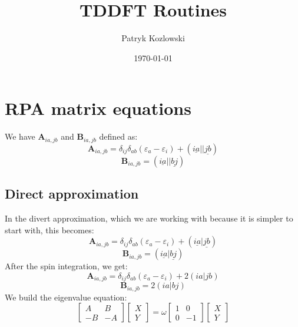 \documentclass[12pt]{article}
\author{Patryk Kozlowski}
\title{TDDFT Routines}
\date{\today}
\begin{document}
\maketitle
\section{RPA matrix equations}
We have $\textbf{A}_{ia,jb}$ and $\textbf{B}_{ia,jb}$ defined as:
\begin{equation}
    \textbf{A}_{ia,jb} = \delta _{ij}\delta _{ab}(\varepsilon _{a}- \varepsilon _{i}) + (\underline{ia}||\underline{jb})
\end{equation}
\begin{equation}
    \textbf{B}_{ia,jb} = (\underline{ia}||\underline{bj})
\end{equation}
\subsection{Direct approximation}
In the divert approximation, which we are working with because it is simpler to start with, this becomes:
\begin{equation}
    \textbf{A}_{ia,jb} = \delta _{ij}\delta _{ab}(\varepsilon _{a}- \varepsilon _{i}) + (\underline{ia}|\underline{jb})
\end{equation}
\begin{equation}
    \textbf{B}_{ia,jb} = (\underline{ia}|\underline{bj})
\end{equation}
After the spin integration, we get:
\begin{equation}
    \textbf{A}_{ia,jb} = \delta _{ij}\delta _{ab}(\varepsilon _{a}- \varepsilon _{i}) + 2(ia|jb)
\end{equation}
\begin{equation}
    \textbf{B}_{ia,jb} = 2(ia|bj)
\end{equation}
We build the eigenvalue equation:
\begin{equation}
\begin{bmatrix}
A & B \\
-B & -A
\end{bmatrix}
\begin{bmatrix}
X \\
Y
\end{bmatrix}
= \omega
\begin{bmatrix}
1 & 0 \\
0 & -1
\end{bmatrix}
\begin{bmatrix}
X \\
Y
\end{bmatrix}
\end{equation}
\end{document}
